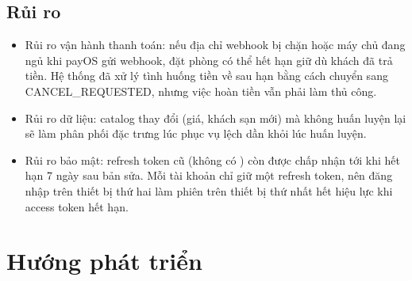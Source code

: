 \subsection{Rủi ro}

\begin{itemize}
\item Rủi ro vận hành thanh toán: nếu địa chỉ webhook bị chặn hoặc máy chủ đang ngủ khi payOS gửi webhook, đặt phòng có thể hết hạn giữ dù khách đã trả tiền. Hệ thống đã xử lý tình huống tiền về sau hạn bằng cách chuyển sang CANCEL\_REQUESTED, nhưng việc hoàn tiền vẫn phải làm thủ công.
\item Rủi ro dữ liệu: catalog thay đổi (giá, khách sạn mới) mà không huấn luyện lại sẽ làm phân phối đặc trưng lúc phục vụ lệch dần khỏi lúc huấn luyện.
\item Rủi ro bảo mật: refresh token cũ (không có ) còn được chấp nhận tới khi hết hạn 7 ngày sau bản sửa. Mỗi tài khoản chỉ giữ một refresh token, nên đăng nhập trên thiết bị thứ hai làm phiên trên thiết bị thứ nhất hết hiệu lực khi access token hết hạn.
\end{itemize}

\section{Hướng phát triển}\label{sec:future}

